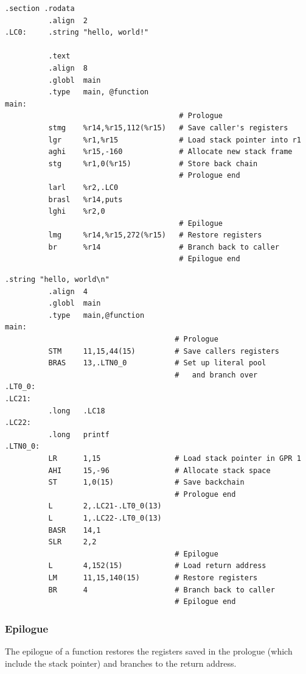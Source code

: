 \documentclass[USenglish,fontsize=11pt,twoside,%
  toc=bib,toc=idx,toc=graduated,numbers=noendperiod,
  bookmarks=true,
  bookmarksnumbered=true,
  bookmarksopen=true,
  bookmarksopenlevel=1,
  breaklinks=true,
  colorlinks=true,
  linkcolor=black,
  pdfpagelayout={TwoPageRight},
  pdfusetitle=true
]{scrreprt}
\begin{document}
\ifzseries
\begin{lstlisting}[language=simpleasm,style=float,label=lst:prolcode,
  caption={[Prologue and epilogue example]{Prologue and epilogue example.
      This example stores the optional backchain.}}]
          .section .rodata
          .align  2
.LC0:     .string "hello, world!"

          .text
          .align  8
          .globl  main
          .type   main, @function
main:
                                        # Prologue
          stmg    %r14,%r15,112(%r15)   # Save caller's registers
          lgr     %r1,%r15              # Load stack pointer into r1
          aghi    %r15,-160             # Allocate new stack frame
          stg     %r1,0(%r15)           # Store back chain
                                        # Prologue end
          larl    %r2,.LC0
          brasl   %r14,puts
          lghi    %r2,0
                                        # Epilogue
          lmg     %r14,%r15,272(%r15)   # Restore registers
          br      %r14                  # Branch back to caller
                                        # Epilogue end
\end{lstlisting}
\else
\begin{lstlisting}[language=simpleasm,style=float,label=lst:prolcode,
  caption=Prologue and epilogue example]
          .string "hello, world\n"
          .align  4
          .globl  main
          .type   main,@function
main:
                                       # Prologue
          STM     11,15,44(15)         # Save callers registers
          BRAS    13,.LTN0_0           # Set up literal pool
                                       #   and branch over
.LT0_0:
.LC21:
          .long   .LC18
.LC22:
          .long   printf
.LTN0_0:
          LR      1,15                 # Load stack pointer in GPR 1
          AHI     15,-96               # Allocate stack space
          ST      1,0(15)              # Save backchain
                                       # Prologue end
          L       2,.LC21-.LT0_0(13)
          L       1,.LC22-.LT0_0(13)
          BASR    14,1
          SLR     2,2
                                       # Epilogue
          L       4,152(15)            # Load return address
          LM      11,15,140(15)        # Restore registers
          BR      4                    # Branch back to caller
                                       # Epilogue end
\end{lstlisting}
\fi

\subsubsection{Epilogue}
The epilogue of a function restores the registers saved in the prologue
(which include the stack pointer) and branches to the return address.
\end{document}
